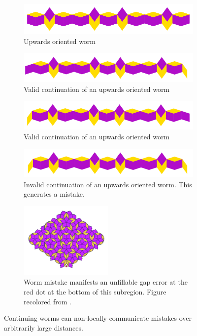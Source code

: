 \documentclass[
  oneside,
  11pt, a4paper,
  footinclude=true,
  headinclude=true,
  cleardoublepage=empty
]{scrbook}
\begin{document}
\begin{figure}[h]
\centering
\begin{subfigure}{\textwidth}
\centering
\includegraphics[width=\textwidth]{ValidWorm0}
\caption{Upwards oriented worm}
\end{subfigure}

\begin{subfigure}{\textwidth}
\centering
\includegraphics[width=\textwidth]{ValidWorm1}
\caption{Valid continuation of an upwards oriented worm}
\end{subfigure}

\begin{subfigure}{\textwidth}
\centering
\includegraphics[width=\textwidth]{ValidWorm2}
\caption{Valid continuation of an upwards oriented worm}
\end{subfigure}

\begin{subfigure}{\textwidth}
\centering
\includegraphics[width=\textwidth]{InvalidWorm}
\caption{Invalid continuation of an upwards oriented worm. This generates a mistake.}
\end{subfigure}

\begin{subfigure}{\textwidth}
\centering
\includegraphics[width=0.5\textwidth]{illegal}
\caption{Worm mistake manifests an unfillable gap error at the red dot at the bottom of this subregion. Figure recolored from \cite{Austin2007}.}
\end{subfigure}

\caption{Continuing worms can non-locally communicate mistakes over arbitrarily large distances.}
\label{fig:wormmistakes}
\end{figure}
\end{document}
